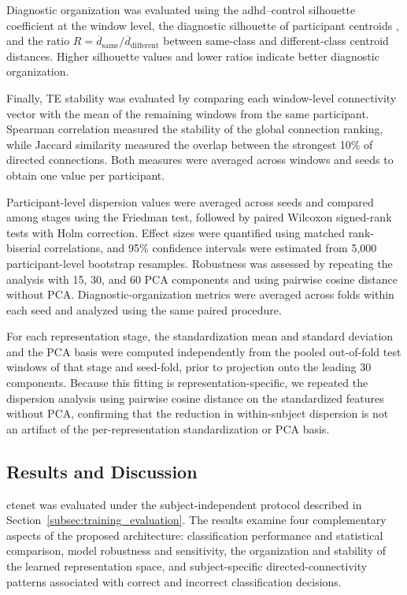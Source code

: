Diagnostic organization was evaluated using the \gls{adhd}--control silhouette coefficient at the window level, the diagnostic silhouette of participant centroids \cite{rousseeuw1987silhouettes}, and the ratio $R=\overline{d}_{\mathrm{same}}/\overline{d}_{\mathrm{different}}$ between same-class and different-class centroid distances. Higher silhouette values and lower ratios indicate better diagnostic organization.

Finally, TE stability was evaluated by comparing each window-level connectivity vector with the mean of the remaining windows from the same participant. Spearman correlation measured the stability of the global connection ranking, while Jaccard similarity measured the overlap between the strongest 10\% of directed connections. Both measures were averaged across windows and seeds to obtain one value per participant.

Participant-level dispersion values were averaged across seeds and compared among stages using the Friedman test, followed by paired Wilcoxon signed-rank tests with Holm correction. Effect sizes were quantified using matched rank-biserial correlations, and 95\% confidence intervals were estimated from 5,000 participant-level bootstrap resamples. Robustness was assessed by repeating the analysis with 15, 30, and 60 PCA components and using pairwise cosine distance without PCA. Diagnostic-organization metrics were averaged across folds within each seed and analyzed using the same paired procedure.

{For each representation stage, the standardization mean and standard deviation and the PCA basis were computed independently from the pooled out-of-fold test windows of that stage and seed-fold, prior to projection onto the leading 30 components. Because this fitting is representation-specific,  we repeated the dispersion analysis using pairwise cosine distance on the standardized features without PCA, confirming that the reduction in within-subject dispersion is not an artifact of the per-representation standardization or PCA basis.}

\subsection{Results and Discussion}
\label{sec:results_and_discussion}
\gls{ctenet} was evaluated under the subject-independent protocol described in Section~\ref{subsec:training_evaluation}. The results examine four complementary aspects of the proposed architecture: classification performance and statistical comparison, model robustness and sensitivity, the organization and stability of the learned representation space, and subject-specific directed-connectivity patterns associated with correct and incorrect classification decisions.

